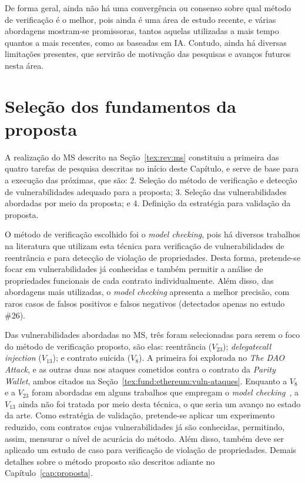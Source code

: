 De forma geral, ainda não há uma convergência ou consenso sobre qual método de verificação é o melhor, pois ainda é uma área de estudo recente, e várias abordagens mostram-se promissoras, tantos aquelas utilizadas a mais tempo quantos a mais recentes, como as baseadas em IA. Contudo, ainda há diversas limitações presentes, que servirão de motivação das pesquisas e avanços futuros nesta área.

\section{Seleção dos fundamentos da proposta}

A realização do MS descrito na Seção~\ref{tex:rev:ms} constituiu a primeira das quatro tarefas de pesquisa descritas no início deste Capítulo, e serve de base para a execução das próximas, que são: 2. Seleção do método de verificação e detecção de vulnerabilidades adequado para a proposta; 3. Seleção das vulnerabilidades abordadas por meio da proposta; e 4. Definição da estratégia para validação da proposta.

O método de verificação escolhido foi o \textit{model checking}, pois há diversos trabalhos na literatura que utilizam esta técnica para verificação de vulnerabilidades de reentrância e para detecção de violação de propriedades. Desta forma, pretende-se focar em vulnerabilidades já conhecidas e também permitir a análise de propriedades funcionais de cada contrato individualmente. Além disso, das abordagens mais utilizadas, o \textit{model checking} apresenta a melhor precisão, com raros casos de falsos positivos e falsos negativos (detectados apenas no estudo \#26).

Das vulnerabilidades abordadas no MS, três foram selecionadas para serem o foco do método de verificação proposto, são elas: reentrância ($V_{23}$); \textit{delegatecall injection} ($V_{13}$); e contrato suicida ($V_{8}$). A primeira foi explorada no \textit{The DAO Attack}, e as outras duas nos ataques cometidos contra o contrato da \textit{Parity Wallet}, ambos citados na Seção~\ref{tex:fund:ethereum:vuln-ataques}. Enquanto a $V_{8}$ e a $V_{23}$ foram abordadas em alguns trabalhos que empregam o \textit{model checking}~\cite{ frank2020ethbmc-32, nelaturu2020verified-101, wang2020formal-04, wang2019detecting-nondeterministic-26}, a $V_{13}$ ainda não foi tratada por meio desta técnica, o que seria um avanço no estado da arte. Como estratégia de validação, pretende-se aplicar um experimento reduzido, com contratos cujas vulnerabilidades já são conhecidas, permitindo, assim, mensurar o nível de acurácia do método. Além disso, também deve ser aplicado um estudo de caso para verificação de violação de propriedades. Demais detalhes sobre o método proposto são descritos adiante no Capítulo~\ref{cap:proposta}.